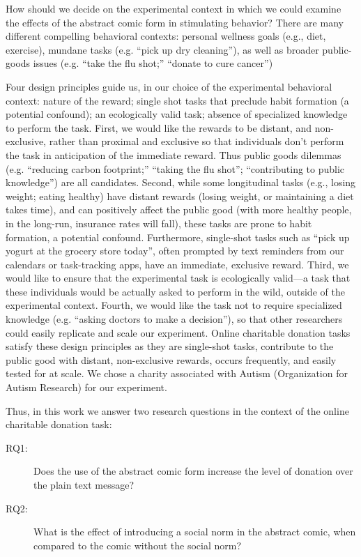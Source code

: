 How should we decide on the experimental context in which we could examine the effects of the abstract comic form in stimulating behavior? There are many different compelling behavioral contexts: personal wellness goals (e.g., diet, exercise), mundane tasks (e.g. ``pick up dry cleaning''), as well as broader public-goods issues (e.g. ``take the flu shot;'' ``donate to cure cancer'')

Four design principles guide us, in our choice of the experimental behavioral context: nature of the reward; single shot tasks that preclude habit formation (a potential confound); an ecologically valid task; absence of specialized knowledge to perform the task. First, we would like the rewards to be distant, and non-exclusive, rather than proximal and exclusive so that individuals don't perform the task in anticipation of the immediate reward. Thus public goods dilemmas (e.g. ``reducing carbon footprint;'' ``taking the flu shot''; ``contributing to public knowledge'') are all candidates. Second, while some longitudinal tasks (e.g., losing weight; eating healthy) have distant rewards (losing weight, or maintaining a diet takes time), and can positively affect the public good (with more healthy people, in the long-run, insurance rates will fall), these tasks are prone to habit formation, a potential confound. Furthermore, single-shot tasks such as ``pick up yogurt at the grocery store today'', often prompted by text reminders from our calendars or task-tracking apps, have an immediate, exclusive reward. Third, we would like to ensure that the experimental task is ecologically valid---a task that these individuals would be actually asked to perform in the wild, outside of the experimental context. Fourth, we would like the task not to require specialized knowledge (e.g. ``asking doctors to make a decision''), so that other researchers could easily replicate and scale our experiment. Online charitable donation tasks satisfy these design principles as they are single-shot tasks, contribute to the public good with distant, non-exclusive rewards, occurs frequently, and easily tested for at scale. We chose a charity associated with Autism (Organization for Autism Research) for our experiment.

Thus, in this work we answer two research questions in the context of the online charitable donation task:
\begin{description}
    \item[RQ1:] Does the use of the abstract comic form increase the level of donation over the plain text message?
    \item[RQ2:] What is the effect of introducing a social norm in the abstract comic, when compared to the comic without the social norm?
\end{description}

